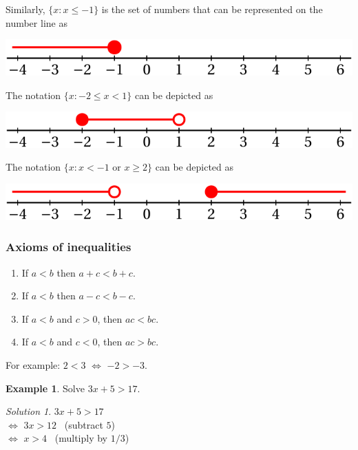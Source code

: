 \documentclass[
  12pt,
  oneside]{book}
\providecommand{\tightlist}{%
  \setlength{\itemsep}{0pt}\setlength{\parskip}{0pt}}
\theoremstyle{definition}
\theoremstyle{definition}
\newtheorem{example}{Example}[chapter]
\theoremstyle{definition}
\theoremstyle{definition}
\theoremstyle{remark}
\newtheorem*{solution}{Solution}
\begin{document}
Similarly, \(\{x: x\leq -1\}\) is the set of numbers that can be represented on the number line as

\begin{center}\includegraphics{t04-numline3} \end{center}

The notation \(\{x: -2\leq x <1\}\) can be depicted as

\begin{center}\includegraphics{t04-numline4} \end{center}

The notation \(\{x: x<-1 \text{ or } x\geq2\}\) can be depicted as

\begin{center}\includegraphics{t04-numline5} \end{center}

\subsubsection*{Axioms of inequalities}\label{axioms-of-inequalities}

\begin{enumerate}
\def\labelenumi{\arabic{enumi}.}
\tightlist
\item
  If \(a<b\) then \(a+c<b+c\).
\item
  If \(a<b\) then \(a-c<b-c\).
\item
  If \(a<b\) and \(c>0\), then \(ac<bc\).
\item
  If \(a<b\) and \(c<0\), then \(ac>bc\).
\end{enumerate}

For example: \(2<3\) \(\iff\) \(-2>-3\).

\begin{example}
Solve \(3x+5>17\).
\end{example}

\begin{solution}
\(3x+5>17\)\\
\(\iff\) \(3x>12\) \hfill~{(subtract \(5\))}\\
\(\iff\) \(x>4\) \hfill~{(multiply by \(1/3\))}
\end{solution}
\end{document}
